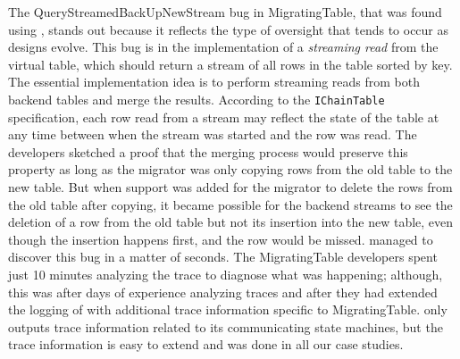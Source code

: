 The QueryStreamedBackUpNewStream bug in MigratingTable, that was found using \psharp, stands out because it reflects the type of oversight that tends to occur as designs evolve. This bug is in the implementation of a \emph{streaming read} from the virtual table, which should return a stream of all rows in the table sorted by key. The essential implementation idea is to perform streaming reads from both backend tables and merge the results. According to the \texttt{IChainTable} specification, each row read from a stream may reflect the state of the table at any time between when the stream was started and the row was read. The developers sketched a proof that the merging process would preserve this property as long as the migrator was only copying rows from the old table to the new table. But when support was added for the migrator to delete the rows from the old table after copying, it became possible for the backend streams to see the deletion of a row from the old table but not its insertion into the new table, even though the insertion happens first, and the row would be missed. \psharp managed to discover this bug in a matter of seconds. The MigratingTable developers spent just 10 minutes analyzing the trace to diagnose what was happening; although, this was after days of experience analyzing traces and after they had extended the logging of \psharp with additional trace information specific to MigratingTable. \psharp only outputs trace information related to its communicating state machines, but the trace information is easy to extend and was done in all our case studies.


